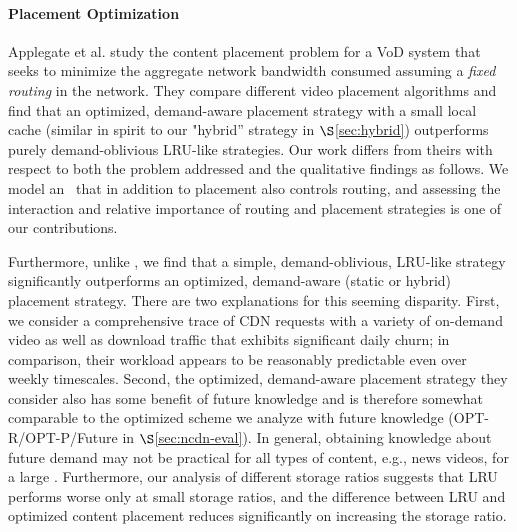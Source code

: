 {\paragraph{Placement Optimization}
Applegate et al. \cite{Applegate2010} study the content placement problem for a VoD system that seeks to minimize the aggregate network bandwidth consumed assuming a {\em fixed routing} in the network.  They  compare different video placement algorithms and find that an optimized, demand-aware placement strategy with a small local cache (similar in spirit to our "hybrid'' strategy in $\S$\ref{sec:hybrid}) outperforms purely demand-oblivious LRU-like strategies. Our work differs from theirs with respect to both the problem addressed and the qualitative findings as follows. We model an \ncp\ that in addition to placement also controls routing, and assessing the interaction and relative importance of routing and placement strategies is one of our contributions. 

Furthermore, unlike \cite{Applegate2010}, we find that a simple, demand-oblivious, LRU-like strategy significantly outperforms an optimized, demand-aware (static or hybrid) placement strategy. There are two explanations for this seeming disparity. First, we consider a comprehensive trace of CDN requests with a variety of on-demand video as well as download traffic that exhibits significant daily churn; in comparison, their workload appears to be reasonably predictable even over weekly timescales. Second, the optimized, demand-aware placement strategy they consider also has some benefit of future knowledge and is therefore somewhat comparable to the optimized scheme we analyze with future knowledge (OPT-R/OPT-P/Future in $\S$\ref{sec:ncdn-eval}). In general, obtaining knowledge about future demand may not be practical for all types of content, e.g., news videos, for a large \ncp.  Furthermore, our analysis of different storage ratios suggests that LRU performs worse only at small storage ratios,  and the difference between  LRU and optimized content placement reduces significantly on increasing the storage ratio.




}
